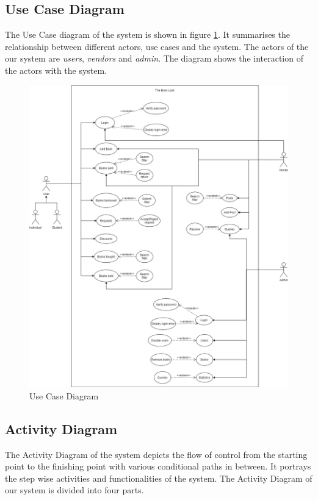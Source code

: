 \documentclass[conference]{IEEEtran}
\begin{document}
\subsection{Use Case Diagram}
The Use Case diagram of the system is shown in figure \ref{fig:usecasediagram}. It summarises the relationship between different actors, use cases and the system. The actors of the our system are \emph{users}, \emph{vendors} and \emph{admin}. The diagram shows the interaction of the actors with the system.
\begin{figure}[h]
     \centering
     \includegraphics[scale=0.18,margin=2,frame]{Use Case Diagram.png}
     \caption{Use Case Diagram}
     \label{fig:usecasediagram}
 \end{figure}
\subsection{Activity Diagram}
The Activity Diagram of the system depicts the flow of control from the starting point to the finishing point with various conditional paths in between. It portrays the step wise activities and functionalities of the system. The Activity Diagram of our system is divided into four parts. 
\end{document}

